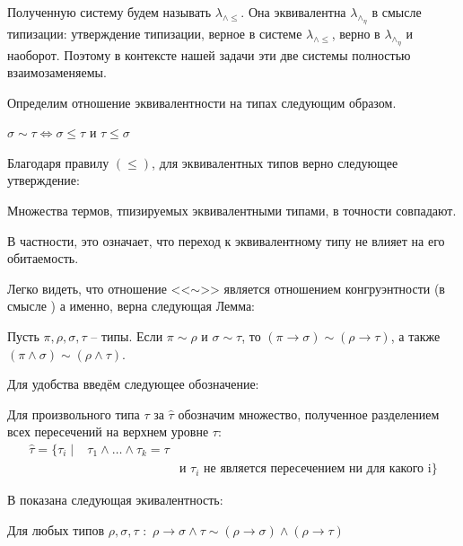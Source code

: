 \documentclass[../main.tex]{subfiles}
\begin{document}
Полученную систему будем называть $\lambda_{\wedge \leqslant}$. Она эквивалентна $\lambda_\wedge_\eta$ в смысле типизации: утверждение типизации, верное в системе  $\lambda_{\wedge \leqslant}$, верно в $\lambda_\wedge_\eta$ и наоборот. Поэтому в контексте нашей задачи эти две системы полностью взаимозаменяемы.

Определим отношение эквивалентности на типах следующим образом. 

\begin{definition}
$\sigma \sim \tau \iff \sigma \leqslant \tau$ и $\tau \leqslant \sigma$
\end{definition}

Благодаря правилу $(\leqslant)$, для эквивалентных типов верно следующее утверждение:

\begin{lemma}
Множества термов, тпизируемых эквивалентными типами, в точности совпадают.
\end{lemma}

В частности, это означает, что переход к эквивалентному типу не влияет на его обитаемость.

Легко видеть, что отношение <<$\sim$>> является отношением конгруэнтности (в смысле \cite{barendregt_2013}) а именно, верна следующая Лемма:
\begin{lemma}
Пусть $\pi, \rho, \sigma, \tau$ -- типы. 
Если $\pi \sim \rho$ и $\sigma \sim \tau$, то $(\pi \to \sigma) \sim (\rho \to \tau)$, а также $(\pi \wedge \sigma) \sim (\rho \wedge \tau)$.
\end{lemma}



Для удобства введём следующее обозначение: 
\begin{definition}
Для произвольного типа $\tau$ за $\hat{\tau}$ обозначим множество, полученное разделением всех пересечений на верхнем уровне $\tau$:
\begin{align*} 
\hat{\tau} = \{\tau_i \mid & \tau_1 \wedge \dots \wedge \tau_k = \tau \\
                               && \text{и $\tau_i$ не является пересечением ни для какого i} \}
\end{align*}
\end{definition}


В \cite{hindley_1982} показана следующая экивалентность: 
\begin{lemma} Для любых типов $\rho, \sigma, \tau$ $\colon$ 
$\rho \to \sigma \wedge \tau \sim (\rho \to \sigma) \wedge (\rho \to \tau)$
\end{lemma}
\end{document}
